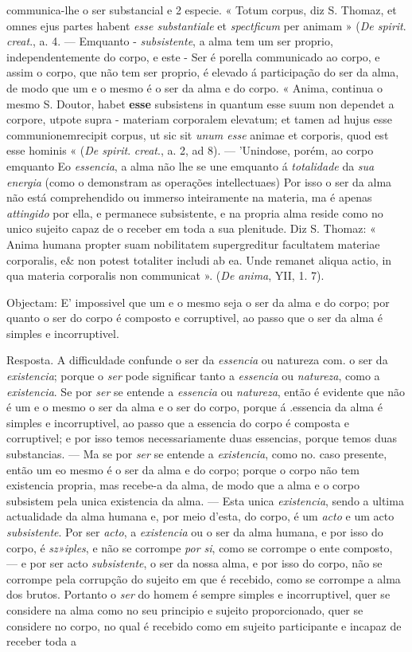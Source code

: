 communica-lhe o ser substancial e 2 especie. « Totum corpus, diz S. Thomaz, et omnes ejus partes habent \emph{esse substantiale} et \emph{spectficum} per animam » (\emph{De spirit}. \emph{creat}., a. 4. --- Emquanto - \emph{subsistente}, a alma tem um ser proprio, independentemente do corpo, e este - Ser é porella communicado ao corpo, e assim o corpo, que não tem ser proprio, é elevado á participação do ser da alma, de modo que um e o mesmo é o ser da alma e do corpo. « Anima, continua o mesmo S. Doutor, habet \textbf{esse} subsistens in quantum esse suum non dependet a corpore, utpote supra - materiam corporalem elevatum; et tamen ad hujus esse communionemrecipit corpus, ut sic sit \emph{unum esse} animae et corporis, quod est esse hominis « (\emph{De spirit}. \emph{creat}., a. 2, ad 8). --- 'Unindose, porém, ao corpo emquanto Eo \emph{essencia}, a alma não lhe se une emquanto á \emph{totalidade} da \emph{sua energia} (como o demonstram as operações intellectuaes) Por isso o ser da alma não está comprehendido ou immerso inteiramente na materia, ma é apenas \emph{attingido} por ella, e permanece subsistente, e na propria alma reside como no unico sujeito capaz de o receber em toda a sua plenitude. Diz S. Thomaz: « Anima humana propter suam nobilitatem supergreditur facultatem materiae corporalis, e\& non potest totaliter includi ab ea. Unde remanet aliqua actio, in qua materia corporalis non communicat ». (\emph{De anima}, YII, 1. 7).\par Objectam: E' impossivel que um e o mesmo seja o ser da alma e do corpo; por quanto o ser do corpo é composto e corruptivel, ao passo que o ser da alma é simples e incorruptivel.\par Resposta. A difficuldade confunde o ser da \emph{essencia} ou natureza com. o ser da \emph{existencia}; porque o \emph{ser} pode significar tanto a \emph{essencia} ou \emph{natureza}, como a \emph{existencia}. Se por \emph{ser} se entende a \emph{essencia} ou \emph{natureza}, então é evidente que não é um e o mesmo o ser da alma e o ser do corpo, porque á .essencia da alma é simples e incorruptivel, ao passo que a essencia do corpo é composta e corruptivel; e por isso temos necessariamente duas essencias, porque temos duas substancias. --- Ma se por \emph{ser} se entende a \emph{existencia}, como no. caso presente, então um eo mesmo é o ser da alma e do corpo; porque o corpo não tem existencia propria, mas recebe-a da alma, de modo que a alma e o corpo subsistem pela unica existencia da alma. --- Esta unica \emph{existencia}, sendo a ultima actualidade da alma humana e, por meio d'esta, do corpo, é um \emph{acto} e um acto \emph{subsistente}. Por ser \emph{acto}, a \emph{existencia} ou o ser da alma humana, e por isso do corpo, é \emph{sz»iples}, e não se corrompe \emph{por si}, como se corrompe o ente composto, --- e por ser acto \emph{subsistente}, o ser da nossa alma, e por isso do corpo, não se corrompe pela corrupção do sujeito em que é recebido, como se corrompe a alma dos brutos. Portanto o \emph{ser} do homem é sempre simples e incorruptivel, quer se considere na alma como no seu principio e sujeito proporcionado, quer se considere no corpo, no qual é recebido como em sujeito participante e incapaz de receber toda a 